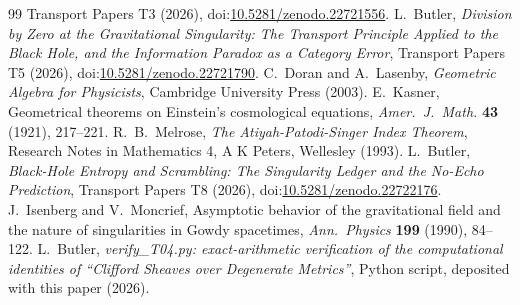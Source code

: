 \documentclass[11pt]{article}
\theoremstyle{definition}
\theoremstyle{plain}
\begin{document}
\begin{thebibliography}{99}
Transport Papers T3 (2026), doi:\href{https://doi.org/10.5281/zenodo.22721556}{10.5281/zenodo.22721556}.
 L.~Butler,
\emph{Division by Zero at the Gravitational Singularity: The Transport Principle Applied to the Black Hole, and the Information Paradox as a Category Error},
Transport Papers T5 (2026), doi:\href{https://doi.org/10.5281/zenodo.22721790}{10.5281/zenodo.22721790}.
 C.~Doran and A.~Lasenby,
\emph{Geometric Algebra for Physicists},
Cambridge University Press (2003).
 E.~Kasner,
Geometrical theorems on Einstein's cosmological equations,
\emph{Amer.\ J.\ Math.} \textbf{43} (1921), 217--221.
 R.~B.~Melrose,
\emph{The Atiyah-Patodi-Singer Index Theorem},
Research Notes in Mathematics 4, A K Peters, Wellesley (1993).
 L.~Butler,
\emph{Black-Hole Entropy and Scrambling: The Singularity Ledger and the No-Echo Prediction},
Transport Papers T8 (2026), doi:\href{https://doi.org/10.5281/zenodo.22722176}{10.5281/zenodo.22722176}.
 J.~Isenberg and V.~Moncrief,
Asymptotic behavior of the gravitational field and the nature of singularities in Gowdy spacetimes,
\emph{Ann.\ Physics} \textbf{199} (1990), 84--122.
 L.~Butler,
\emph{verify\_T04.py: exact-arithmetic verification of the computational identities of ``Clifford Sheaves over Degenerate Metrics''},
Python script, deposited with this paper (2026).
\end{thebibliography}
\end{document}
